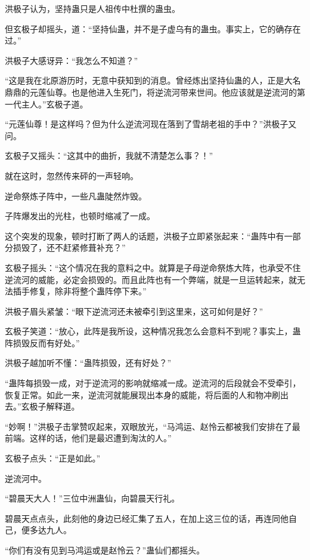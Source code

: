 
\begin{this_body}

洪极子认为，坚持蛊只是人祖传中杜撰的蛊虫。

但玄极子却摇头，道：“坚持仙蛊，并不是子虚乌有的蛊虫。事实上，它的确存在过。”

洪极子大感讶异：“我怎么不知道？”

“这是我在北原游历时，无意中获知到的消息。曾经炼出坚持仙蛊的人，正是大名鼎鼎的元莲仙尊。也是他进入生死门，将逆流河带来世间。他应该就是逆流河的第一代主人。”玄极子道。

“元莲仙尊！是这样吗？但为什么逆流河现在落到了雪胡老祖的手中？”洪极子又问。

玄极子又摇头：“这其中的曲折，我就不清楚怎么事？！”

就在这时，忽然传来砰的一声轻响。

逆命祭炼子阵中，一些凡蛊陡然炸毁。

子阵爆发出的光柱，也顿时缩减了一成。

这个突发的现象，顿时打断了两人的话题，洪极子立即紧张起来：“蛊阵中有一部分损毁了，还不赶紧修葺补充？”

玄极子摇头：“这个情况在我的意料之中。就算是子母逆命祭炼大阵，也承受不住逆流河的威能，必定会损毁的。而且此阵也有一个弊端，就是一旦运转起来，就无法插手修复，除非将整个蛊阵停下来。”

洪极子眉头紧皱：“眼下逆流河还未被牵引到这里来，这可如何是好？”

玄极子笑道：“放心，此阵是我所设，这种情况我怎么会意料不到呢？事实上，蛊阵损毁反而有好处。”

洪极子越加听不懂：“蛊阵损毁，还有好处？”

“蛊阵每损毁一成，对于逆流河的影响就缩减一成。逆流河的后段就会不受牵引，恢复正常。如此一来，逆流河就能展现出本身的威能，将后面的人和物冲刷出去。”玄极子解释道。

“妙啊！”洪极子击掌赞叹起来，双眼放光，“马鸿运、赵怜云都被我们安排在了最前端。这样的话，他们是最迟遭到淘汰的人。”

玄极子点头：“正是如此。”

逆流河中。

“碧晨天大人！”三位中洲蛊仙，向碧晨天行礼。

碧晨天点点头，此刻他的身边已经汇集了五人，在加上这三位的话，再连同他自己，便多达九人。

“你们有没有见到马鸿运或是赵怜云？”蛊仙们都摇头。


\end{this_body}
